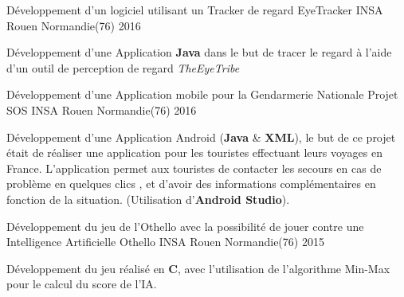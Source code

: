 

\begin{cventries}

  \cventry
	{Développement d'un logiciel utilisant un Tracker de regard} %
	{EyeTracker} %
	{INSA Rouen Normandie(76)} %
	{2016} %
	{
		\begin{cvitems} %
			\item {Développement d'une Application \textbf{Java} dans le but de tracer le regard à l'aide d'un outil de perception de regard \textit{TheEyeTribe}}
		\end{cvitems}
	}

  \cventry
	{Développement d'une Application mobile pour la Gendarmerie Nationale} %
	{Projet SOS} %
	{INSA Rouen Normandie(76)} %
	{2016} %
	{
		\begin{cvitems} %
			\item {Développement d'une Application Android (\textbf{Java} \& \textbf{XML}), le but de ce projet était de réaliser une application pour les touristes effectuant leurs voyages en France. L'application permet aux touristes de contacter les secours en cas de problème en quelques clics , et d'avoir des informations complémentaires en fonction de la situation. (Utilisation d'\textbf{Android Studio}). }
		\end{cvitems}
	}

  \cventry
	{Développement du jeu de l'Othello avec la possibilité de jouer contre une Intelligence Artificielle} %
	{Othello} %
	{INSA Rouen Normandie(76)} %
	{2015} %
	{
		\begin{cvitems} %
			\item {Développement du jeu réalisé en \textbf{C}, avec l'utilisation de l'algorithme Min-Max pour le calcul du score de l'IA.}
		\end{cvitems}
	}


\end{cventries}
